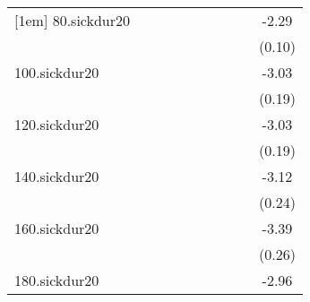 \documentclass{article}
\begin{document}
{\begin{tabular}{l*{9}{c}}
[1em]
80.sickdur20&                     &                     &                     &                     &                     &                     &                     &                     &       -2.29\sym{***}\\
            &                     &                     &                     &                     &                     &                     &                     &                     &      (0.10)         \\
[1em]
100.sickdur20&                     &                     &                     &                     &                     &                     &                     &                     &       -3.03\sym{***}\\
            &                     &                     &                     &                     &                     &                     &                     &                     &      (0.19)         \\
[1em]
120.sickdur20&                     &                     &                     &                     &                     &                     &                     &                     &       -3.03\sym{***}\\
            &                     &                     &                     &                     &                     &                     &                     &                     &      (0.19)         \\
[1em]
140.sickdur20&                     &                     &                     &                     &                     &                     &                     &                     &       -3.12\sym{***}\\
            &                     &                     &                     &                     &                     &                     &                     &                     &      (0.24)         \\
[1em]
160.sickdur20&                     &                     &                     &                     &                     &                     &                     &                     &       -3.39\sym{***}\\
            &                     &                     &                     &                     &                     &                     &                     &                     &      (0.26)         \\
[1em]
180.sickdur20&                     &                     &                     &                     &                     &                     &                     &                     &       -2.96\sym{***}\\

\end{tabular}}
\end{document}
